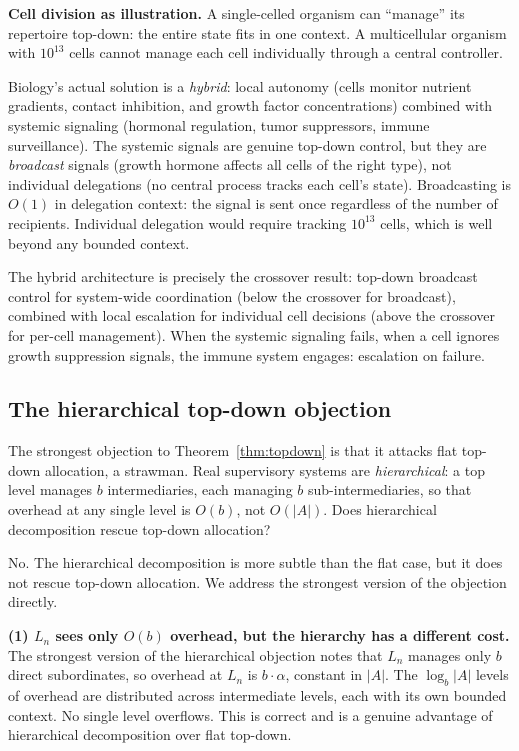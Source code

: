 \documentclass[11pt]{article}
\theoremstyle{definition}
\begin{document}
\textbf{Cell division as illustration.} A single-celled organism can
``manage'' its repertoire top-down: the entire state fits in one
context. A multicellular organism with $10^{13}$ cells cannot manage
each cell individually through a central controller.

Biology's actual solution is a \emph{hybrid}: local autonomy (cells
monitor nutrient gradients, contact inhibition, and growth factor
concentrations) combined with systemic signaling (hormonal regulation,
tumor suppressors, immune surveillance). The systemic signals are
genuine top-down control, but they are \emph{broadcast} signals
(growth hormone affects all cells of the right type), not individual
delegations (no central process tracks each cell's state). Broadcasting
is $O(1)$ in delegation context: the signal is sent once regardless of
the number of recipients. Individual delegation would require tracking
$10^{13}$ cells, which is well beyond any bounded context.

The hybrid architecture is precisely the crossover result: top-down
broadcast control for system-wide coordination (below the crossover for
broadcast), combined with local escalation for individual cell
decisions (above the crossover for per-cell management). When the
systemic signaling fails, when a cell ignores growth suppression
signals, the immune system engages: escalation on failure.

\subsection{The hierarchical top-down objection}

The strongest objection to Theorem~\ref{thm:topdown} is that it attacks
flat top-down allocation, a strawman. Real supervisory systems are
\emph{hierarchical}: a top level manages $b$ intermediaries, each
managing $b$ sub-intermediaries, so that overhead at any single level is
$O(b)$, not $O(|A|)$. Does hierarchical decomposition rescue top-down
allocation?

No. The hierarchical decomposition is more subtle than the flat case,
but it does not rescue top-down allocation. We address the strongest
version of the objection directly.

\textbf{(1) $L_n$ sees only $O(b)$ overhead, but the hierarchy has
a different cost.}
The strongest version of the hierarchical objection notes that $L_n$
manages only $b$ direct subordinates, so overhead at $L_n$ is
$b \cdot \alpha$, constant in $|A|$. The $\log_b |A|$ levels of
overhead are distributed across intermediate levels, each with its own
bounded context. No single level overflows. This is correct and is a
genuine advantage of hierarchical decomposition over flat top-down.
\end{document}
